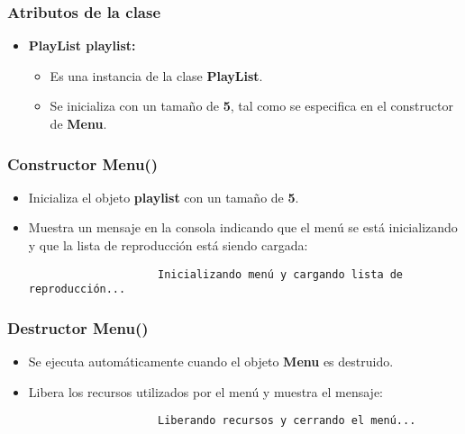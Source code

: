 \documentclass[corference]{IEEEtran}
\begin{document}
\begin{flushleft}
            \subsubsection{Atributos de la clase}
                \begin{itemize}
                    \item \textbf{PlayList playlist:} 
                    \begin{itemize}
                        \item Es una instancia de la clase \textbf{PlayList}.
                        \item Se inicializa con un tamaño de \textbf{5}, tal como se especifica en el constructor de \textbf{Menu}.
                    \end{itemize}
                \end{itemize}
            
            \subsubsection{Constructor Menu()}
                \begin{itemize}
                    \item Inicializa el objeto \textbf{playlist} con un tamaño de \textbf{5}.
                    \item Muestra un mensaje en la consola indicando que el menú se está inicializando y que la lista de reproducción está siendo cargada:
                    \begin{verbatim}
                    Inicializando menú y cargando lista de reproducción...
                    \end{verbatim}
                \end{itemize}
            
            \subsubsection{Destructor  Menu()}
                \begin{itemize}
                    \item Se ejecuta automáticamente cuando el objeto \textbf{Menu} es destruido.
                    \item Libera los recursos utilizados por el menú y muestra el mensaje:
                    \begin{verbatim}
                    Liberando recursos y cerrando el menú...
                    \end{verbatim}
                \end{itemize}
            

\end{flushleft}
\end{document}

